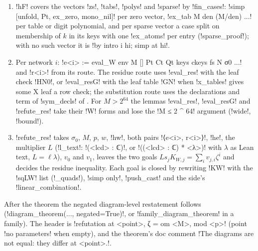 {{{\begin{enumerate}
by \lexpy!combination! of $q_{ph}\,\mathrm{coef\_at}(ph, j) - \sum c\,\zeta^e$.
\item \lexlean!hF! covers the vectors \lexpy!zs!, \lexpy!tabs!, \lexpy!polys! and \lexpy!sparse! by
\lexlean!fin_cases!: \lexlean!simp [unfold, Pt, ex_zero, mono_nil]! per zero vector,
\lexlean!ex_tab M den (M/den) ...! per table or digit polynomial, and per sparse vector a case split
on membership of $k$ in its keys with one \lexlean!ex_atoms! per entry (\lexpy!sparse_proof!); with
no such vector it is \lexlean!by intro i hi; simp at hi!.
\item Per network $i$: \lexlean!e<i> := eval_W env M [] Pt Ct Qt keys ckeys fs N σ0 ...! and
\lexlean!r<i>! from its route. The residue route uses \lexlean!eval_res! with the leaf check
\lexlean!HN0!, or \lexlean!eval_resG! with the leaf table \lexlean!GN! when \lexpy!x_tables! gives some X
leaf a row check; the substitution route uses the declarations and term of \lexpy!sym_decls! of
. For $M > 2^{64}$ the lemmas \lexlean!eval_res!,
\lexlean!eval_resG! and \lexlean!refute_res! take their \lexlean!W! forms and lose the
\lexlean!M ≤ 2 ^ 64! argument (\lexpy!wide!, \lexpy!bound!).
\item \lexlean!refute_res! takes $\sigma_0$, $M$, $p$, $w$, \lexlean!hw!, both pairs
\lexlean!⟨e<i>, r<i>⟩!, \lexlean!he!, the multiplier $L$ (\lexpy!l_text!: \lexlean!(<lcd> : ℂ)!, or
\lexlean!((<lcd> : ℂ) * <λ>)! with $\lambda$ as Lean text, $L = \ell\lambda$), $v_0$ and $v_1$, leaves the two goals $L s_jK_{W,j} = \sum_i v_{j,i}\zeta^i$
and decides the residue inequality. Each goal is closed by rewriting \lexlean!KW! with the
\lexlean!sqLW! list (\lexpy!_quads!), \lexlean!simp only!, \lexlean!push_cast! and the side's
\lexcode!linear_combination!.
\end{enumerate}
After the theorem the negated diagram-level restatement follows
(\lexpy!diagram_theorem(..., negated=True)!, or \lexpy!family_diagram_theorem! in a family). The
header is \lexcode!refutation at <point>, ζ = om <M>, mod <p>! (point
\lexcode!no parameters! when empty), and the theorem's doc comment
\lexcode!The diagrams are not equal: they differ at <point>.!.

}}}
